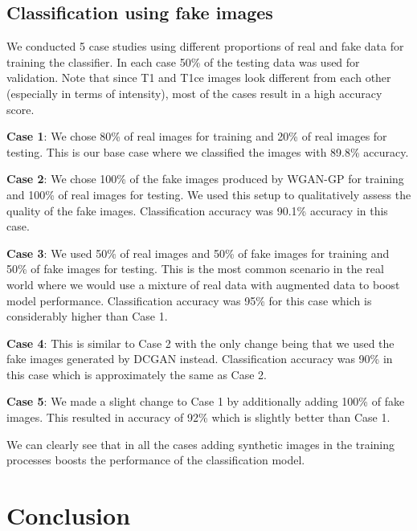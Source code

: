 \documentclass[10pt,journal,compsoc]{IEEEtran}
\begin{document}
\subsection{Classification using fake images}

We conducted 5 case studies using different proportions of real and fake data for training
the classifier. In each case 50\% of the testing data was used for validation. Note that
since T1 and T1ce images look different from each other (especially in terms of intensity),
most of the cases result in a high accuracy score.

\textbf{Case 1}: We chose 80\% of real images for training and 20\% of real images for
testing. This is our base case where we classified the images with 89.8\% accuracy.

\textbf{Case 2}: We chose 100\% of the fake images produced by WGAN-GP for training and
100\% of real images for testing. We used this setup to qualitatively assess the quality
of the fake images. Classification accuracy was 90.1\% accuracy in this case.

\textbf{Case 3}: We used 50\% of real images and 50\% of fake images for training and
50\% of fake images for testing. This is the most common scenario in the real world where
we would use a mixture of real data with augmented data to boost model performance.
Classification accuracy was 95\% for this case which is considerably higher than Case 1.

\textbf{Case 4}: This is similar to Case 2 with the only change being that we used the
fake images generated by DCGAN instead. Classification accuracy was 90\% in this case which
is approximately the same as Case 2.

\textbf{Case 5}: We made a slight change to Case 1 by additionally adding 100\% of fake
images. This resulted in accuracy of 92\% which is slightly better than Case 1.

We can clearly see that in all the cases adding synthetic images in the training processes
boosts the performance of the classification model.

\section{Conclusion}
\end{document}
